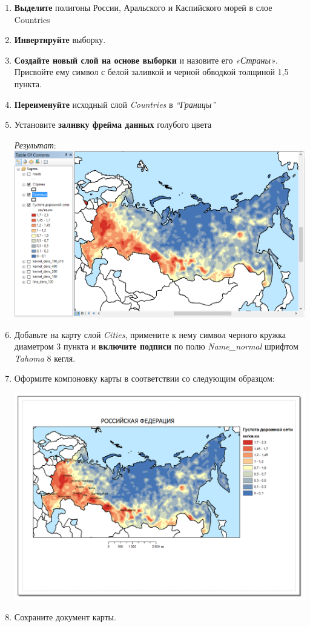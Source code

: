 \documentclass[12pt,]{book}
\begin{document}
\begin{enumerate}
\def\labelenumi{\arabic{enumi}.}
\item
  \textbf{Выделите} полигоны России, Аральского и Каспийского морей в слое Countries
\item
  \textbf{Инвертируйте} выборку.
\item
  \textbf{Создайте новый слой на основе выборки} и назовите его \emph{«Страны»}. Присвойте ему символ с белой заливкой и черной обводкой толщиной 1,5 пункта.
\item
  \textbf{Переименуйте} исходный слой \emph{Countries} в \emph{``Границы''}
\item
  Установите \textbf{заливку фрейма данных} голубого цвета

  \emph{Результат}:
  \includegraphics{images/Ex16/image18.png}
\item
  Добавьте на карту слой \emph{Cities}, примените к нему символ черного кружка диаметром 3 пункта и \textbf{включите подписи} по полю \emph{Name\_normal} шрифтом \emph{Tahoma} 8 кегля.
\item
  Оформите компоновку карты в соответствии со следующим образцом:

  \includegraphics{images/Ex16/image19.png}
\item
  Сохраните документ карты.
\end{enumerate}
\end{document}
